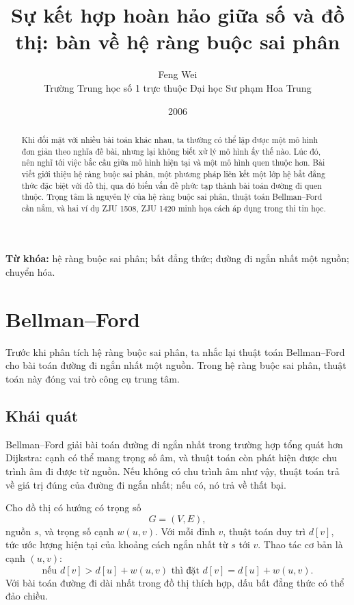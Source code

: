 \documentclass[11pt]{article}
\title{Sự kết hợp hoàn hảo giữa số và đồ thị: bàn về hệ ràng buộc sai phân}
\author{Feng Wei\\Trường Trung học số 1 trực thuộc Đại học Sư phạm Hoa Trung}
\date{2006}
\begin{document}
\maketitle


\renewcommand{\abstractname}{Tóm tắt}
\begin{abstract}
Khi đối mặt với nhiều bài toán khác nhau, ta thường có thể lập được một mô
hình đơn giản theo nghĩa đề bài, nhưng lại không biết xử lý mô hình ấy thế
nào. Lúc đó, nên nghĩ tới việc bắc cầu giữa mô hình hiện tại và một mô hình
quen thuộc hơn. Bài viết giới thiệu hệ ràng buộc sai phân, một phương pháp
liên kết một lớp hệ bất đẳng thức đặc biệt với đồ thị, qua đó biến vấn đề
phức tạp thành bài toán đường đi quen thuộc. Trọng tâm là nguyên lý của hệ
ràng buộc sai phân, thuật toán Bellman--Ford cần nắm, và hai ví dụ ZJU 1508,
ZJU 1420 minh họa cách áp dụng trong thi tin học.
\end{abstract}

\noindent\textbf{Từ khóa:} hệ ràng buộc sai phân; bất đẳng thức; đường đi ngắn
nhất một nguồn; chuyển hóa.

\section{Bellman--Ford}

Trước khi phân tích hệ ràng buộc sai phân, ta nhắc lại thuật toán
Bellman--Ford cho bài toán đường đi ngắn nhất một nguồn. Trong hệ ràng buộc
sai phân, thuật toán này đóng vai trò công cụ trung tâm.

\subsection{Khái quát}

Bellman--Ford giải bài toán đường đi ngắn nhất trong trường hợp tổng quát hơn
Dijkstra: cạnh có thể mang trọng số âm, và thuật toán còn phát hiện được chu
trình âm đi được từ nguồn. Nếu không có chu trình âm như vậy, thuật toán trả
về giá trị đúng của đường đi ngắn nhất; nếu có, nó trả về thất bại.

Cho đồ thị có hướng có trọng số
\[
  G=(V,E),
\]
nguồn \(s\), và trọng số cạnh \(w(u,v)\). Với mỗi đỉnh \(v\), thuật toán duy
trì \(d[v]\), tức ước lượng hiện tại của khoảng cách ngắn nhất từ \(s\) tới
\(v\). Thao tác cơ bản là  cạnh \((u,v)\):
\[
  \text{nếu } d[v]>d[u]+w(u,v)\text{ thì đặt }d[v]=d[u]+w(u,v).
\]
Với bài toán đường đi dài nhất trong đồ thị thích hợp, dấu bất đẳng thức có
thể đảo chiều.
\end{document}
